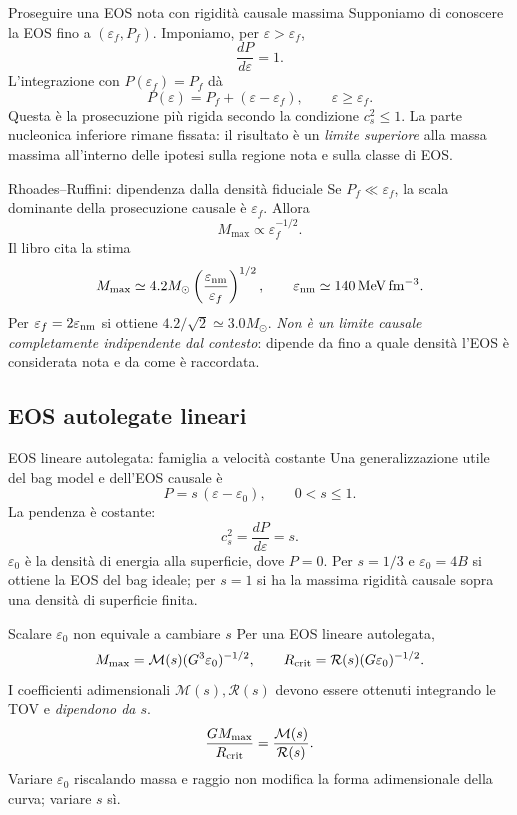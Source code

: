 \begin{frame}[t]{Proseguire una EOS nota con rigidità causale massima}
\small
Supponiamo di conoscere la EOS fino a $(\varepsilon_f,P_f)$.
Imponiamo, per $\varepsilon>\varepsilon_f$,
\[
\frac{dP}{d\varepsilon}=1.
\]
L'integrazione con $P(\varepsilon_f)=P_f$ dà
\[
P(\varepsilon)=P_f+(\varepsilon-\varepsilon_f),
\qquad\varepsilon\geq\varepsilon_f.
\]
Questa è la prosecuzione più rigida secondo la condizione $c_s^2\leq1$.
\medskip
La parte nucleonica inferiore rimane fissata: il risultato è un \emph{limite superiore} alla massa massima all'interno delle ipotesi sulla regione nota e sulla classe di EOS.
\end{frame}

\begin{frame}[t]{Rhoades--Ruffini: dipendenza dalla densità fiduciale}
\small
Se $P_f\ll\varepsilon_f$, la scala dominante della prosecuzione causale è $\varepsilon_f$. Allora
\[
M_{\max}\propto\varepsilon_f^{-1/2}.
\]
Il libro cita la stima
\[
M_{\max}\simeq4.2M_\odot
\left(\frac{\varepsilon_{\rm nm}}{\varepsilon_f}\right)^{1/2},
\qquad\varepsilon_{\rm nm}\simeq140\,\mathrm{MeV\,fm^{-3}}.
\]
Per $\varepsilon_f=2\varepsilon_{\rm nm}$ si ottiene $4.2/\sqrt 2\simeq3.0M_\odot$.
\medskip
\emph{Non è un limite causale completamente indipendente dal contesto}: dipende da fino a quale densità l'EOS è considerata nota e da come è raccordata.
\end{frame}

\subsection{EOS autolegate lineari}

\begin{frame}[t]{EOS lineare autolegata: famiglia a velocità costante}
\small
Una generalizzazione utile del bag model e dell'EOS causale è
\[
P=s\,(\varepsilon-\varepsilon_0),\qquad 0<s\leq1.
\]
La pendenza è costante:
\[
c_s^2=\frac{dP}{d\varepsilon}=s.
\]
$\varepsilon_0$ è la densità di energia alla superficie, dove $P=0$.
\medskip
Per $s=1/3$ e $\varepsilon_0=4B$ si ottiene la EOS del bag ideale; per $s=1$ si ha la massima rigidità causale sopra una densità di superficie finita.
\end{frame}

\begin{frame}[t]{Scalare $\varepsilon_0$ non equivale a cambiare $s$}
\small
Per una EOS lineare autolegata,
\[
M_{\max}=\mathcal M(s)(G^3\varepsilon_0)^{-1/2},
\qquad R_{\rm crit}=\mathcal R(s)(G\varepsilon_0)^{-1/2}.
\]
I coefficienti adimensionali $\mathcal M(s),\mathcal R(s)$ devono essere ottenuti integrando le TOV e \emph{dipendono da $s$}.
\[
\frac{GM_{\max}}{R_{\rm crit}}
=\frac{\mathcal M(s)}{\mathcal R(s)}.
\]
Variare $\varepsilon_0$ riscalando massa e raggio non modifica la forma adimensionale della curva; variare $s$ sì.
\end{frame}

